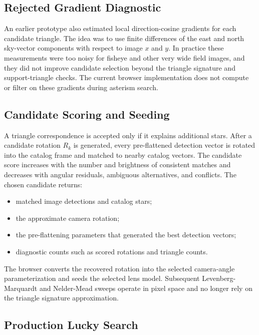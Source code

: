 \documentclass[11pt]{article}
\begin{document}
\subsection{Rejected Gradient Diagnostic}

An earlier prototype also estimated local direction-cosine gradients for each
candidate triangle. The idea was to use finite differences of the east and
north sky-vector components with respect to image \(x\) and \(y\). In practice
these measurements were too noisy for fisheye and other very wide field
images, and they did not improve candidate selection beyond the triangle
signature and support-triangle checks. The current browser implementation does
not compute or filter on these gradients during asterism search.

\subsection{Candidate Scoring and Seeding}

A triangle correspondence is accepted only if it explains additional stars.
After a candidate rotation \(R_k\) is generated, every pre-flattened detection
vector is rotated into the catalog frame and matched to nearby catalog vectors.
The candidate score increases with the number and brightness of consistent
matches and decreases with angular residuals, ambiguous alternatives, and
conflicts. The chosen candidate returns:
\begin{itemize}
  \item matched image detections and catalog stars;
  \item the approximate camera rotation;
  \item the pre-flattening parameters that generated the best detection
        vectors;
  \item diagnostic counts such as scored rotations and triangle counts.
\end{itemize}
The browser converts the recovered rotation into the selected camera-angle
parameterization and seeds the selected lens model. Subsequent Levenberg-Marquardt and
Nelder-Mead sweeps operate in pixel space and no longer rely on the triangle
signature approximation.

\subsection{Production Lucky Search}
\end{document}
